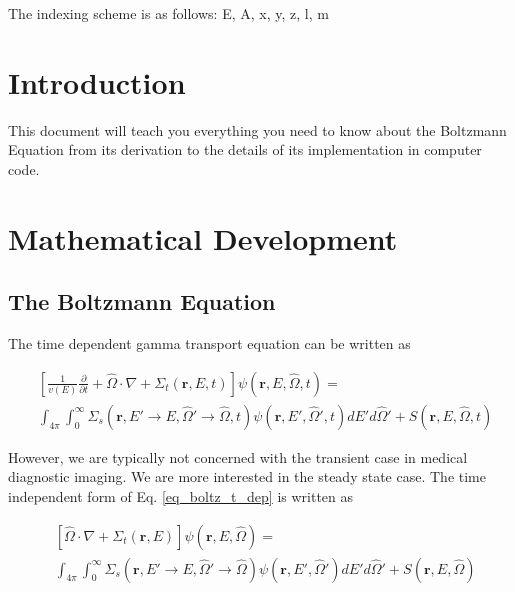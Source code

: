 \documentclass{article}
\numberwithin{equation}{subsection}
\begin{document}
The indexing scheme is as follows: E, A, x, y, z, l, m

\section{Introduction}
This document will teach you everything you need to know about the Boltzmann Equation from its derivation to the details of its implementation in computer code.

\section{Mathematical Development}

\subsection{The Boltzmann Equation}

The time dependent gamma transport equation can be written as

\begin{equation} \label{eq_boltz_t_dep}
\begin{split}
	&\left[ \frac{1}{v(E)} \frac{\partial}{\partial t} + \hat{\Omega} \cdot \nabla + \Sigma_t(\boldsymbol{r}, E, t) \right]
	\psi(\boldsymbol{r}, E, \hat{\Omega}, t) = \\
	&\int_{4 \pi} \int_0^\infty \Sigma_s(\boldsymbol{r}, E' \rightarrow E, \hat{\Omega}' \rightarrow \hat{\Omega}, t) \psi(\boldsymbol{r}, E', \hat{\Omega}', t) dE' d\hat{\Omega}' + S(\boldsymbol{r}, E, \hat{\Omega}, t)
\end{split}
\end{equation}

However, we are typically not concerned with the transient case in medical diagnostic imaging. We are more interested in the steady state case. The time independent form of Eq. \ref{eq_boltz_t_dep} is written as

\begin{equation} \label{eq_boltz}
\begin{split}
	&\left[ \hat{\Omega} \cdot \nabla + \Sigma_t(\boldsymbol{r}, E) \right]
	\psi(\boldsymbol{r}, E, \hat{\Omega}) = \\
	&\int_{4 \pi} \int_0^\infty \Sigma_s(\boldsymbol{r}, E' \rightarrow E, \hat{\Omega}' \rightarrow \hat{\Omega}) \psi(\boldsymbol{r}, E', \hat{\Omega}') dE' d\hat{\Omega}' + S(\boldsymbol{r}, E, \hat{\Omega})
\end{split}
\end{equation}
\end{document}
